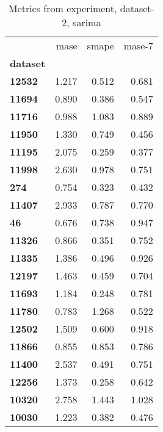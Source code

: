 \begin{table}[h]
\centering
\caption{Metrics from experiment, dataset-2, sarima}
\label{table:sarima-dataset-2}
\begin{tabular}{lrrr}
\toprule
{} &   mase &  smape &  mase-7 \\
\textbf{dataset} &        &        &         \\
\midrule
\textbf{12532  } &  1.217 &  0.512 &   0.681 \\
\textbf{11694  } &  0.890 &  0.386 &   0.547 \\
\textbf{11716  } &  0.988 &  1.083 &   0.889 \\
\textbf{11950  } &  1.330 &  0.749 &   0.456 \\
\textbf{11195  } &  2.075 &  0.259 &   0.377 \\
\textbf{11998  } &  2.630 &  0.978 &   0.751 \\
\textbf{274    } &  0.754 &  0.323 &   0.432 \\
\textbf{11407  } &  2.933 &  0.787 &   0.770 \\
\textbf{46     } &  0.676 &  0.738 &   0.947 \\
\textbf{11326  } &  0.866 &  0.351 &   0.752 \\
\textbf{11335  } &  1.386 &  0.496 &   0.926 \\
\textbf{12197  } &  1.463 &  0.459 &   0.704 \\
\textbf{11693  } &  1.184 &  0.248 &   0.781 \\
\textbf{11780  } &  0.783 &  1.268 &   0.522 \\
\textbf{12502  } &  1.509 &  0.600 &   0.918 \\
\textbf{11866  } &  0.855 &  0.853 &   0.786 \\
\textbf{11400  } &  2.537 &  0.491 &   0.751 \\
\textbf{12256  } &  1.373 &  0.258 &   0.642 \\
\textbf{10320  } &  2.758 &  1.443 &   1.028 \\
\textbf{10030  } &  1.223 &  0.382 &   0.476 \\
\bottomrule
\end{tabular}
\end{table}
